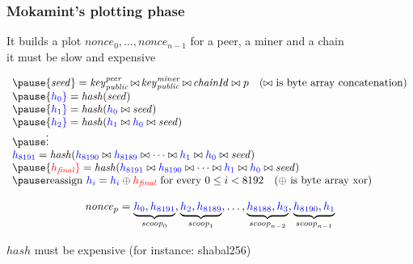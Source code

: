 \documentclass[11pt]{beamer}  %
\newcommand{\nonce}{{\mathit{nonce}}}
\newcommand{\scoop}{{\mathit{scoop}}}
\newcommand{\seed}{{\mathit{seed}}}
\newcommand{\public}{{\mathit{public}}}
\newcommand{\chainid}{{\mathit{chainId}}}
\newcommand{\hash}{{\mathit{hash}}}
\newcommand{\finalhash}{{h_{\mathit{final}}}}
\DeclareMathOperator*{\append}{\bowtie}
\begin{document}
\begin{frame}\frametitle{Mokamint's plotting phase}
  \begin{center}
    It builds a plot $\nonce_0,\ldots,\nonce_{n-1}$
    for a peer, a miner and a chain\\
    \alert{it must be slow and expensive}
  \end{center}

  \[\begin{array}{l}
  \pause
  \seed=\mathit{key}^{\mathit{peer}}_\public\append\mathit{key}^{\mathit{miner}}_\public\append\chainid\bowtie p\quad\text{($\bowtie$ is byte array concatenation)}\\
  \pause
  {\color{blue} h_0}=\hash(\seed)\\
  \pause
  {\color{blue} h_1}=\hash({\color{blue} h_0}\bowtie\seed)\\
  \pause
  {\color{blue} h_2}=\hash({\color{blue} h_1}\bowtie{\color{blue}  h_0}\bowtie \seed)\\
  \pause
  \vdots\\
  {\color{blue} h_{8191}}=\hash({\color{blue} h_{8190}}\bowtie{\color{blue} h_{8189}}\bowtie\cdots\bowtie{\color{blue} h_1}\bowtie{\color{blue} h_0}\bowtie \seed)\\
  \pause
  {\color{red}\finalhash}=\hash({\color{blue} h_{8191}}\bowtie{\color{blue} h_{8190}}\bowtie\cdots\bowtie{\color{blue} h_1}\bowtie{\color{blue} h_0}\bowtie \seed)\\
  \pause
  \text{reassign }{\color{blue} h_i}={\color{blue} h_i}\oplus{\color{red}\finalhash}\text{ for every }0\le i<8192\quad\text{($\oplus$ is byte array xor)}\\
  \end{array}\]

  \pause

  \[
  \nonce_p=\underbrace{{\color{blue}h_0},{\color{blue}h_{8191}}}_{\scoop_0},\underbrace{{\color{blue}h_2},{\color{blue}h_{8189}}}_{\scoop_1},\ldots,\underbrace{{\color{blue}h_{8188}},{\color{blue}h_3}}_{\scoop_{n-2}},\underbrace{{\color{blue}h_{8190}},{\color{blue}h_1}}_{\scoop_{n-1}}
  \]

  \pause
  \begin{center}
    $\hash$ must be expensive (for instance: shabal256)
  \end{center}

\end{frame}
\end{document}

